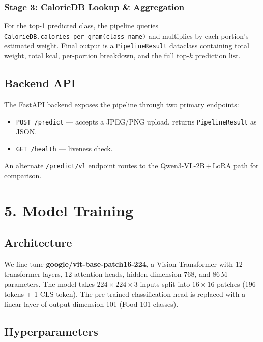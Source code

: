 \documentclass[fleqn,10pt]{SelfArx}
\begin{document}
\subsubsection{Stage 3: CalorieDB Lookup \& Aggregation}

For the top-1 predicted class, the pipeline queries \texttt{CalorieDB.calories\_per\_gram(class\_name)} and multiplies by each portion's estimated weight. Final output is a \texttt{PipelineResult} dataclass containing total weight, total kcal, per-portion breakdown, and the full top-$k$ prediction list.

\subsection{Backend API}

The FastAPI backend exposes the pipeline through two primary endpoints:
\begin{itemize}[noitemsep]
    \item \texttt{POST /predict} — accepts a JPEG/PNG upload, returns \texttt{PipelineResult} as JSON.
    \item \texttt{GET /health} — liveness check.
\end{itemize}

An alternate \texttt{/predict/vl} endpoint routes to the Qwen3-VL-2B\,+\,LoRA path for comparison.

\section{5. Model Training}

\subsection{Architecture}

We fine-tune \textbf{google/vit-base-patch16-224}, a Vision Transformer with 12 transformer layers, 12 attention heads, hidden dimension 768, and 86\,M parameters. The model takes $224 \times 224 \times 3$ inputs split into $16 \times 16$ patches (196 tokens + 1 CLS token). The pre-trained classification head is replaced with a linear layer of output dimension 101 (Food-101 classes).

\subsection{Hyperparameters}
\end{document}
